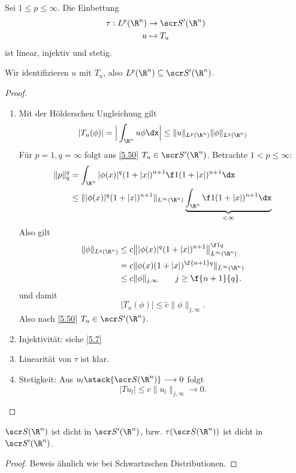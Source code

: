 \begin{df} \label{5.53}
	Sei $1 \le p \le \infty$.
	Die Einbettung
	\begin{align*}
		\tau : L^p (\R^n) &\to \scr S'(\R^n) \\
		u &\mapsto T_u
	\end{align*}
	ist linear, injektiv und stetig.
	
	Wir identifizieren $u$ mit $T_u$, also $L^p(\R^n) \subset \scr S'(\R^n)$.
	\begin{proof}
		\begin{enumerate}[1)]
			\item
				Mit der Hölderschen Ungleichung gilt
				\[
					|T_u(\phi)|
					= \Big|\int_{\R^n} u\phi \dx \Big|
					\le \|u\|_{L^p(\R^n)} \|\phi\|_{L^q(\R^n)}
				\]
				Für $p = 1, q = \infty$ folgt aus \ref{5.50} $T_u \in \scr S'(\R^n)$.
				Betrachte $1 < p \le \infty$:
				\begin{align*}
					\|p\|_q^q
					&= \int_{\R^n} |\phi(x)|^q (1+|x|)^{n+1} \f 1{(1+|x|)^{n+1}} \dx \\
					&\le \||\phi(x)|^q(1+|x|)^{n+1}\|_{L^\infty(\R^n)} \underbrace{\int_{\R^n} \f 1{(1+|x|)^{n+1}} \dx}_{< \infty}
				\end{align*}
				Also gilt
				\begin{align*}
					\|\phi\|_{L^q(\R^n)}
					&\le c \big\| |\phi(x)|^q (1+|x|)^{n+1}\big\|_{L^\infty(\R^n)}^{\f 1q} \\
					&= c \| \phi(x) (1+|x|)^{\f {n+1}q} \|_{L^\infty(\R^n)} \\
					&\le c \|\phi\|_{j,\infty} \qquad j \ge \f {n+1}{q}.
				\end{align*}
				und damit
				\[
					|T_u (\phi)| \le \tilde c \|\phi\|_{j,\infty}.
				\]
				Also nach \ref{5.50} $T_u \in \scr S'(\R^n)$.
			\item
				Injektivität: siehe \ref{5.7}
			\item
				Linearität von $\tau$ ist klar.
			\item
				Stetigkeit:
				Aus $u_l \stack{\scr S(\R^n)} \longrightarrow 0$ folgt
				\[
					|Tu_l| \le c \|u_l\|_{j,\infty} \to 0.
				\]
		\end{enumerate}
	\end{proof}
\end{df}


\begin{st} \label{5.54}
	$\scr S(\R^n)$ ist dicht in $\scr S'(\R^n)$, bzw. $\tau(\scr S(\R^n))$ ist dicht in $\scr S'(\R^n)$.
	\begin{proof}
		Beweis ähnlich wie bei Schwartzschen Distributionen.
	\end{proof}
\end{st}

